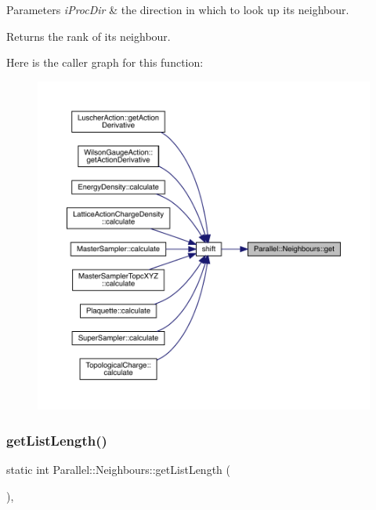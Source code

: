\begin{DoxyParams}{Parameters}
{\em i\+Proc\+Dir} & the direction in which to look up its neighbour. \\
\hline
\end{DoxyParams}
\begin{DoxyReturn}{Returns}
the rank of its neighbour. 
\end{DoxyReturn}
Here is the caller graph for this function\+:
\nopagebreak
\begin{figure}[H]
\begin{center}
\leavevmode
\includegraphics[width=350pt]{class_parallel_1_1_neighbours_a84653f3e22436280ac5a4689a24e7146_icgraph}
\end{center}
\end{figure}
\mbox{\label{class_parallel_1_1_neighbours_aadbdf345a7b541bd6705bddac1969961}} 
\subsubsection{\texorpdfstring{getListLength()}{getListLength()}}
{\footnotesize\ttfamily static int Parallel\+::\+Neighbours\+::get\+List\+Length (\begin{DoxyParamCaption}{ }\end{DoxyParamCaption})\hspace{0.3cm}{\ttfamily [inline]}, {\ttfamily [static]}}

